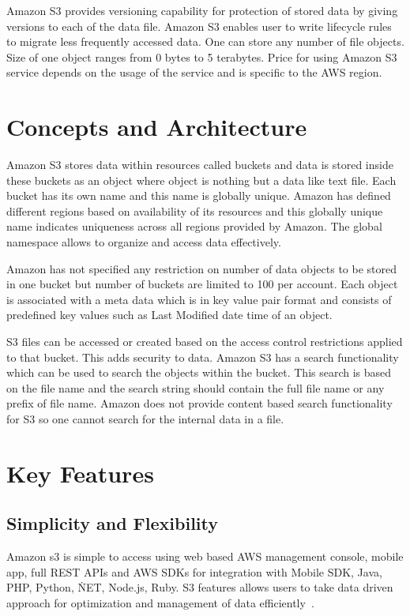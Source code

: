 Amazon S3 provides versioning capability for protection of stored data by giving
versions to each of the data file. Amazon S3 enables user to write lifecycle
rules to migrate less frequently accessed data. One can store any number of file
objects. Size of one object ranges from 0 bytes to 5 terabytes. Price for using
Amazon S3 service depends on the usage of the service and is specific to the AWS
region.



\section{Concepts and Architecture}


Amazon S3 stores data within resources called buckets and data is stored inside
these buckets as an object where object is nothing but a data like text file.
Each bucket has its own name and this name is globally unique. Amazon has
defined different regions based on availability of its resources and this
globally unique name indicates uniqueness across all regions provided by Amazon.
The global namespace allows to organize and access data effectively.

Amazon has not specified any restriction on number of data objects to be stored
in one bucket but number of buckets are limited to 100 per account. Each object
is associated with a meta data which is in key value pair format and consists of
predefined key values such as Last Modified date time of an object.

S3 files can be accessed or created based on the access control restrictions
applied to that bucket. This adds security to data. Amazon S3 has a search
functionality which can be used to search the objects within the bucket. This
search is based on the file name and the search string should contain the full
file name or any prefix of file name. Amazon does not provide content based
search functionality for S3 so one cannot search for the internal data in a
file.




\section{Key Features}


\subsection{Simplicity and Flexibility} 

Amazon s3 is simple to access using web based AWS management console,
mobile app, full REST APIs and AWS SDKs for integration with Mobile
SDK, Java, PHP, Python, \.NET, Node.js, Ruby. S3 features allows users
to take data driven approach for optimization and management of data
efficiently~\cite{hid-sp18-420-amazon-S3-FAQ}.


